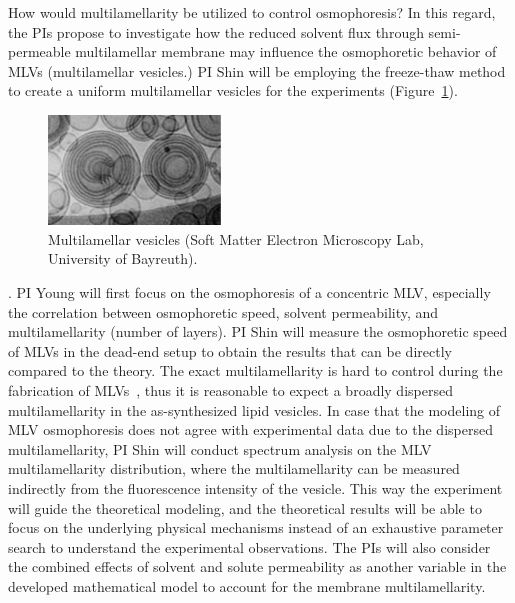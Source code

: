 \documentclass[11pt]{article}
\begin{document}
How would multilamellarity be utilized to control osmophoresis?  In this
regard, the PIs propose to investigate how the reduced solvent flux
through semi-permeable multilamellar membrane may influence the
osmophoretic behavior of MLVs (multilamellar vesicles.) PI Shin will be
employing the freeze-thaw method to create a uniform multilamellar
vesicles for the experiments (Figure~\ref{fig:Multilamellar}).
\begin{figure}
\centerline{\includegraphics[width=1.8in]{figs/Multilamellar.pdf}}
\caption{ \label{fig:Multilamellar} Multilamellar vesicles (Soft Matter
  Electron Microscopy Lab, University of Bayreuth).}
\end{figure}
%
\cite{szoka1980}. 
PI Young will first focus on the osmophoresis of a concentric MLV,
especially the correlation between osmophoretic speed, solvent
permeability, and multilamellarity (number of layers).  PI Shin will
measure the osmophoretic speed of MLVs in the dead-end setup to obtain
the results that can be directly compared to the theory.  The exact
multilamellarity is hard to control during the fabrication of
MLVs~\cite{Lasic1988_BiochemJ}, thus it is reasonable to expect a
broadly dispersed multilamellarity in the as-synthesized lipid vesicles.
In case that the modeling of MLV osmophoresis does not agree with
experimental data due to the dispersed multilamellarity, PI Shin will
conduct spectrum analysis on the MLV multilamellarity distribution,
where the multilamellarity can be measured indirectly from the
fluorescence intensity of the vesicle.  This way the experiment will
guide the theoretical modeling, and the theoretical results will be able
to focus on the underlying physical mechanisms instead of an exhaustive
parameter search to understand the experimental observations.  The PIs
will also consider the combined effects of  solvent and solute
permeability as another variable in the developed mathematical model to
account for the membrane multilamellarity. 
\end{document}
